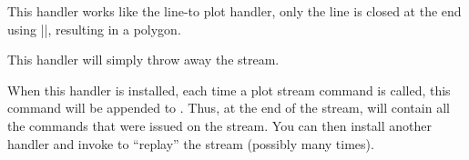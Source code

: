\begin{command}{\pgfplothandlerpolygon}
  This handler works like the line-to plot handler, only the line is
  closed at the end using |\pgfpathclose|, resulting in a polygon.
\end{command}

\begin{command}{\pgfplothandlerdiscard}
  This handler will simply throw away the stream.
\end{command}

\begin{command}{\pgfplothandlerrecord{}}
  When this handler is installed, each time a plot stream command is
  called, this command will be appended to . Thus, at
  the end of the stream,  will contain all the
  commands that were issued on the stream. You can then install
  another handler and invoke  to ``replay'' the stream
  (possibly many times).

\begin{codeexample}[]
\begin{pgfpicture}
  \pgfplothandlerrecord{\mystream}
  \pgfplotstreamstart
  \pgfplotstreampoint{\pgfpoint{1cm}{0cm}}
  \pgfplotstreampoint{\pgfpoint{2cm}{1cm}}
  \pgfplotstreampoint{\pgfpoint{3cm}{1cm}}
  \pgfplotstreampoint{\pgfpoint{1cm}{2cm}}
  \pgfplotstreamend
  \pgfplothandlerlineto
  \mystream
  \pgfplothandlerclosedcurve
  \mystream
\end{pgfpicture}
\end{codeexample}
\end{command}

